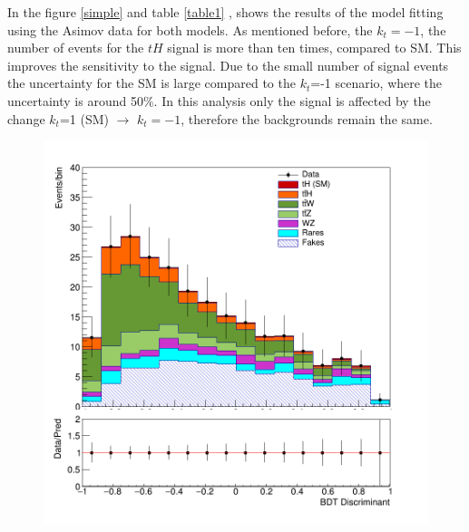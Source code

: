 In the figure \ref{simple} and table \ref{table1} , shows the results of the model fitting using the Asimov data for both models. As mentioned before, the  $k_t=-1$, the number of events for the $tH$ signal is more than ten times, compared to SM. This improves the sensitivity to the signal. Due to the small number of signal events the uncertainty for the SM is large compared to the $k_t$=-1 scenario, where the uncertainty is around 50$\%$. In this analysis only the signal is affected by the change $k_t$=1 (SM) $\rightarrow$  $k_t=-1$, therefore the backgrounds remain the same.
\begin{figure}[!htbp]
	\centering
	\begin{minipage}[b]{0.48\textwidth}
		\includegraphics[width=\textwidth]{Chapter4/simple.png}
	\end{minipage}
	\hfill
	\begin{minipage}[b]{0.48\textwidth}

\end{minipage}
\end{figure}
